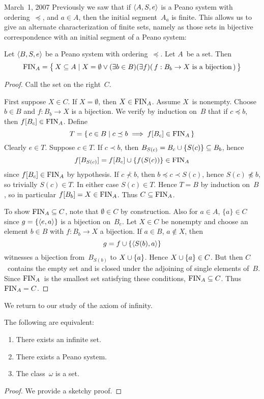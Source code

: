 \begin{lecture}{March~1, 2007}
Previously we saw that if \(\langle{A},{{S},{e}}\rangle\) is a Peano system with ordering~\(\preceq\), and \(a\in A\), then the initial segment~\(A_a\) is finite. This allows us to give an alternate characterization of finite sets, namely as those sets in bijective correspondence with an initial segment of a Peano system:
\begin{thm}
Let \(\langle{B},{{S},{e}}\rangle\) be a Peano system with ordering~\(\preceq\). Let \(A\)~be a set. Then
\[\operatorname{FIN}_A=\bigl\{\,X\subseteq A\mid X=\emptyset\lor (\exists b\in B)(\exists f)(\,f:B_b\to X\text{ is a bijection}\,)\,\bigr\}\]
\end{thm}
\begin{proof}
Call the set on the right~\(C\).

First suppose \(X\in C\). If \(X=\emptyset\), then \(X\in\operatorname{FIN}_A\). Assume \(X\)~is nonempty. Choose \(b\in B\) and \(f:B_b\to X\) is a bijection. We verify by induction on~\(B\) that if \(c\preceq b\), then \(f[B_c]\in\operatorname{FIN}_A\). Define
\[T=\{\,c\in B\mid c\preceq b\implies f[B_c]\in\operatorname{FIN}_A\,\}\]
Clearly \(e\in T\). Suppose \(c\in T\). If \(c\prec b\), then \(B_{S(c)}=B_c\cup\{S(c)\}\subseteq B_b\), hence
\[f[B_{S(c)}]=f[B_c]\cup\{f(S(c))\}\in\operatorname{FIN}_A\]
since \(f[B_c]\in\operatorname{FIN}_A\) by hypothesis. If \(c\not\prec b\), then \(b\preceq c\prec S(c)\), hence \(S(c)\not\preceq b\), so trivially \(S(c)\in T\). In either case \(S(c)\in T\). Hence \(T=B\) by induction on~\(B\), so in particular \(f[B_b]=X\in\operatorname{FIN}_A\). Thus \(C\subseteq\operatorname{FIN}_A\).

To show \(\operatorname{FIN}_A\subseteq C\), note that \(\emptyset\in C\) by construction. Also for \(a\in A\), \(\{a\}\in C\) since \(g=\{\langle{e},{a}\rangle\}\) is a bijection on~\(B_e\). Let \(X\in C\) be nonempty and choose an element \(b\in B\) with \(f:B_b\to X\) a bijection. If \(a\in B\), \(a\not\in X\), then
\[g=f\cup\{\langle{S(b)},{a}\rangle\}\]
witnesses a bijection from~\(B_{S(b)}\) to \(X\cup\{a\}\). Hence \(X\cup\{a\}\in C\). But then \(C\)~contains the empty set and is closed under the adjoining of single elements of~\(B\). Since \(\operatorname{FIN}_A\)~is the smallest set satisfying these conditions, \(\operatorname{FIN}_A\subseteq C\). Thus \(\operatorname{FIN}_A=C\).
\end{proof}

We return to our study of the axiom of infinity.
\begin{thm}
The following are equivalent:
\begin{enumerate}[itemsep=0pt]
\item[(1)] There exists an infinite set.
\item[(2)] There exists a Peano system.
\item[(3)] The class~\(\omega\) is a set.
\end{enumerate}
\end{thm}
\begin{proof}
We provide a sketchy proof.


\end{proof}
\end{lecture}
